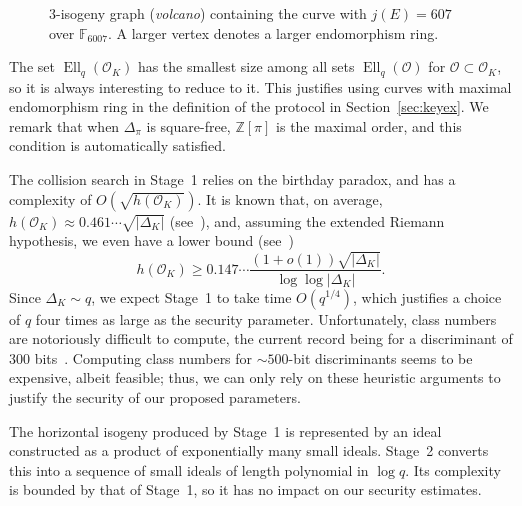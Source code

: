 \documentclass{llncs}
\newcommand{\F}{\mathbb{F}}
\renewcommand{\O}{\mathcal{O}}
\DeclareMathOperator{\Ell}{Ell}
\begin{document}
\begin{figure}
  \centering
  \caption{$3$-isogeny graph (\emph{volcano}) containing the curve
    with $j(E)=607$ over $\F_{6007}$. A larger vertex denotes a larger
    endomorphism ring.}
  \label{fig:volcano}
\end{figure}

The set $\Ell_q(\O_K)$ has the smallest size among all sets
$\Ell_q(\O)$ for $\O⊂\O_K$, so it is always interesting to
reduce to it. This justifies using curves with maximal endomorphism
ring in the definition of the protocol in
Section~\ref{sec:keyex}. We remark that when $Δ_π$ is square-free, $ℤ[π]$
is the maximal order, and this condition is automatically satisfied.

The collision search in Stage~1 relies on the birthday paradox, and
has a complexity of $O(\sqrt{h(\O_K)})$.
It is known that, on average,
$h(\O_K)≈0.461\cdots\sqrt{|Δ_K|}$ (see~\cite[5.10]{Cohen1993}), and,
assuming the extended Riemann hypothesis, we even have a lower bound
(see~\cite{littlewood1928class})
\[h(\O_K) ≥ 0.147\cdots\frac{(1+o(1))\sqrt{|Δ_K|}}{\log\log|Δ_K|}.\]
Since $Δ_K\sim q$, we expect Stage~1 to take time $O(q^{1/4})$,
which justifies a choice of $q$ four times as large as the
security parameter.  Unfortunately, class numbers are notoriously
difficult to compute, the current record being
for a discriminant of 300 bits~\cite{10.1007/978-3-642-14081-5_15}.
Computing class numbers for ${\sim 500}$-bit discriminants seems to be expensive,
albeit feasible; thus, we can only rely on these heuristic arguments
to justify the security of our proposed parameters.

The horizontal isogeny produced by Stage~1 is represented by an ideal
constructed as a product of exponentially many small ideals.
Stage~2 converts this into a sequence of small ideals of length
polynomial in \(\log q\).
Its complexity is bounded by that of Stage~1,
so it has no impact on our security estimates.
\end{document}
